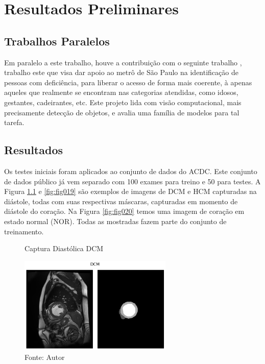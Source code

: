 \chapter{Resultados  Preliminares}
\label{chap:resultados_discussao}

\section{Trabalhos Paralelos} 
\label{sec:cap6_trabalhos_paralelos}

Em paralelo a este trabalho, houve a contribuição com o seguinte trabalho \cite{adornoAutomaticDetectionPeople2023}, trabalho este que visa dar apoio ao metrô de São Paulo na identificação de pessoas com deficiência, para liberar o acesso de forma mais coerente, à apenas aqueles que realmente se encontram nas categorias atendidas, como idosos, gestantes, cadeirantes, etc. Este projeto lida com visão computacional, mais precisamente detecção de objetos, e avalia uma família de modelos para tal tarefa.


\section{Resultados} 
\label{sec:cap6_resultados}

Os testes iniciais foram aplicados ao conjunto de dados do \gls{ACDC}. Este conjunto de dados público já vem separado com 100 exames para treino e 50 para testes. A Figura \ref{fig:fig018} e \ref{fig:fig019} são exemplos de imagens de \gls{DCM} e \gls{HCM} capturadas na diástole, todas com suas respectivas máscaras, capturadas em momento de diástole do coração. Na Figura \ref{fig:fig020} temos uma imagem de coração em estado normal (\gls{NOR}). Todas as mostradas fazem parte do conjunto de treinamento.

\begin{figure}[htbp]
    \caption{Captura Diastólica DCM}
    \centering
    \includegraphics[width=0.65\textwidth]{figures/fig018.png}
    \caption{Fonte: Autor}
    \label{fig:fig018}
\end{figure}

